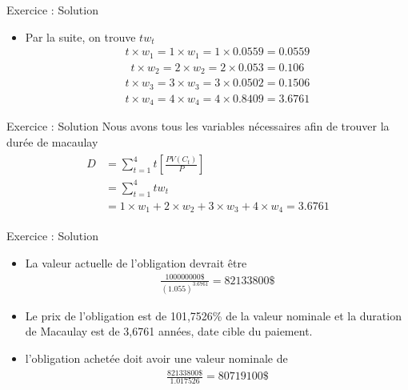 \documentclass{beamer}
\begin{document}
\begin{frame}{Exercice : Solution}
\begin{itemize}[label=\bullet]
\item Par la suite, on trouve $tw_t$
\begin{align*}
t \times w_1=1 \times w_1 =1 \times 0.0559 = 0.0559                                       
\end{align*} 
\begin{align*}
t \times w_2= 2 \times w_2 =2 \times 0.053  = 0.106                                
\end{align*} 
\begin{align*}
t \times w_3= 3 \times w_3 =3 \times 0.0502 = 0.1506                             
\end{align*} 
\begin{align*}
t \times w_4= 4 \times w_4 =4 \times 0.8409  = 3.6761                           
\end{align*} 
\end{itemize}
\end{frame}
\begin{frame}{Exercice : Solution}
Nous avons tous les variables nécessaires afin de trouver la durée de macaulay 
\begin{align*}
\begin{split}
D & =\sum_{t=1}^4 t \left[ \frac{PV(C_t)}{P} \right]\\
&=\sum_{t=1}^4 tw_t \\
&=1 \times w_1+2 \times w_2+ 3 \times w_3+4 \times w_4= 3.6761     
\end{split}
\end{align*}
\end{frame}

\begin{frame}{Exercice : Solution}
\begin{itemize}[label=\bullet]
\item La valeur actuelle de l'obligation devrait être
\begin{align*}
\frac{100 000 000\$}{(1.055)^{3.6761}}=82 133 800\$
\end{align*}
\item Le prix de l'obligation est de 101,7526\% de la valeur nominale et la duration de Macaulay est de 3,6761 années,  date cible du paiement.
\item l'obligation achetée doit avoir une valeur nominale de
\begin{align*}
\frac{82 133 800\$}{1.017526}=80 719 100\$
\end{align*}
\end{itemize}
\end{frame}
\end{document}
